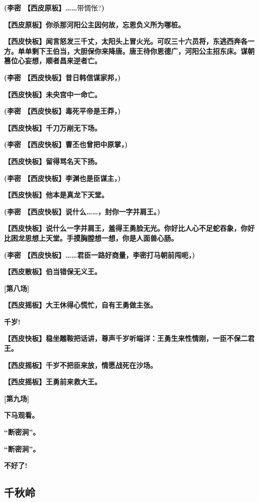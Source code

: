\textbf{(李密 【西皮原板】\ldots{}\ldots{}}带惆怅?\textbf{)}

\textbf{【西皮原板】你杀那河阳公主因何故，忘恩负义所为哪桩。}

\textbf{【西皮快板】闻言怒发三千丈，太阳头上冒火光。可叹三十六员将，东逃西奔各一方。单单剩下王伯当，大胆保你来降唐。唐王待你恩德广，河阳公主招东床。谋朝篡位心妄想，顺者昌来逆者亡。}

\textbf{(李密 【西皮快板】昔日韩信谋家邦，)}

\textbf{【西皮快板】未央宫中一命亡。}

\textbf{(李密 【西皮快板】毒死平帝是王莽，)}

\textbf{【西皮快板】千刀万剐无下场。}

\textbf{(李密 【西皮快板】曹丕也曾把中原掌，)}

\textbf{【西皮快板】留得骂名天下扬。}

\textbf{(李密 【西皮快板】李渊也是臣谋主，)}

\textbf{【西皮快板】他本是真龙下天堂。}

\textbf{(李密 【西皮快板】说什么\ldots{}\ldots{}，封你一字并肩王。)}

\textbf{【西皮快板】说什么一字并肩王，羞得王勇脸无光。你好比人心不足蛇吞象，你好比困龙思想上天堂。手摸胸膛想一想，你是人面兽心肠。}

\textbf{(李密
【西皮快板】\ldots{}\ldots{}君臣一路好商量，李密打马朝前闯呃，)}

\textbf{【西皮散板】伯当错保无义王。}

\textbf{{[}第八场{]}}

\textbf{【西皮摇板】大王休得心慌忙，自有王勇做主张。}

\textbf{千岁!}

\textbf{【西皮快板】稳坐雕鞍把话讲，尊声千岁听端详：王勇生来性情刚，一臣不保二君王。}

\textbf{【西皮摇板】千岁不把臣来放，情愿战死在沙场。}

\textbf{【西皮摇板】王勇前来救大王。}

\textbf{{[}第九场{]}}

\textbf{下马观看。}

\textbf{``断密涧''。}

\textbf{``断密涧''。}

\textbf{不好了!}

\newpage
\hypertarget{ux5343ux79cbux5cad}{%
\subsection{千秋岭}\label{ux5343ux79cbux5cad}}

